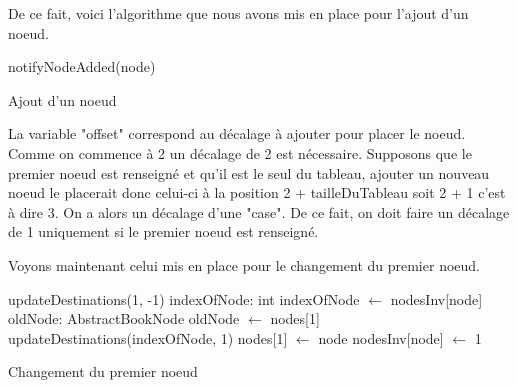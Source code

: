			De ce fait, voici l'algorithme que nous avons mis en place pour l'ajout d'un noeud.

			\begin{algorithm}[H]
				\DontPrintSemicolon



				notifyNodeAdded(node)
				\caption{Ajout d'un noeud}
			\end{algorithm}

			La variable "offset" correspond au décalage à ajouter pour placer le noeud. Comme on commence à 2 un décalage de 2 est nécessaire. Supposons que le premier noeud est renseigné et qu'il est le seul du tableau, ajouter un nouveau noeud le placerait donc celui-ci à la position 2 + tailleDuTableau soit 2 + 1 c'est à dire 3. On a alors un décalage d'une "case". De ce fait, on doit faire un décalage de 1 uniquement si le premier noeud est renseigné.

			Voyons maintenant celui mis en place pour le changement du premier noeud.

			\begin{algorithm}[H]
				\DontPrintSemicolon

				\;
				updateDestinations(1, -1)\;
				\;
				indexOfNode: int\;
				indexOfNode $\gets$ nodesInv[node]\;
				\;
				oldNode: AbstractBookNode\;
				oldNode $\gets$ nodes[1]\;
				\;
				updateDestinations(indexOfNode, 1)\;
				\;
				nodes[1] $\gets$ node\;
				nodesInv[node] $\gets$ 1\;
				\;

				\caption{Changement du premier noeud}
			\end{algorithm}

